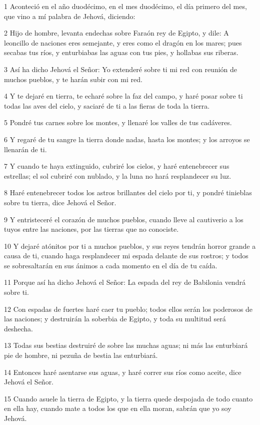\par 1 Aconteció en el año duodécimo, en el mes duodécimo, el día primero del mes, que vino a mí palabra de Jehová, diciendo:
\par 2 Hijo de hombre, levanta endechas sobre Faraón rey de Egipto, y dile: A leoncillo de naciones eres semejante, y eres como el dragón en los mares; pues secabas tus ríos, y enturbiabas las aguas con tus pies, y hollabas sus riberas.
\par 3 Así ha dicho Jehová el Señor: Yo extenderé sobre ti mi red con reunión de muchos pueblos, y te harán subir con mi red.
\par 4 Y te dejaré en tierra, te echaré sobre la faz del campo, y haré posar sobre ti todas las aves del cielo, y saciaré de ti a las fieras de toda la tierra.
\par 5 Pondré tus carnes sobre los montes, y llenaré los valles de tus cadáveres.
\par 6 Y regaré de tu sangre la tierra donde nadas, hasta los montes; y los arroyos se llenarán de ti.
\par 7 Y cuando te haya extinguido, cubriré los cielos, y haré entenebrecer sus estrellas; el sol cubriré con nublado, y la luna no hará resplandecer su luz. 
\par 8 Haré entenebrecer todos los astros brillantes del cielo por ti, y pondré tinieblas sobre tu tierra, dice Jehová el Señor.
\par 9 Y entristeceré el corazón de muchos pueblos, cuando lleve al cautiverio a los tuyos entre las naciones, por las tierras que no conociste.
\par 10 Y dejaré atónitos por ti a muchos pueblos, y sus reyes tendrán horror grande a causa de ti, cuando haga resplandecer mi espada delante de sus rostros; y todos se sobresaltarán en sus ánimos a cada momento en el día de tu caída.
\par 11 Porque así ha dicho Jehová el Señor: La espada del rey de Babilonia vendrá sobre ti.
\par 12 Con espadas de fuertes haré caer tu pueblo; todos ellos serán los poderosos de las naciones; y destruirán la soberbia de Egipto, y toda su multitud será deshecha.
\par 13 Todas sus bestias destruiré de sobre las muchas aguas; ni más las enturbiará pie de hombre, ni pezuña de bestia las enturbiará.
\par 14 Entonces haré asentarse sus aguas, y haré correr sus ríos como aceite, dice Jehová el Señor.
\par 15 Cuando asuele la tierra de Egipto, y la tierra quede despojada de todo cuanto en ella hay, cuando mate a todos los que en ella moran, sabrán que yo soy Jehová.
